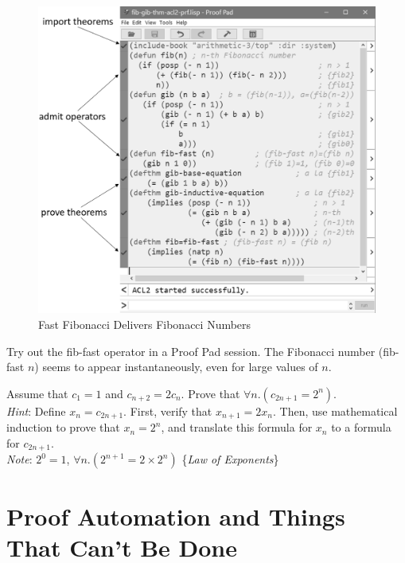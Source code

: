 \begin{figure}
\begin{center}
\includegraphics[scale=0.5]{images/fib-gib-thm-acl2-prf.png}
\end{center}
\caption{Fast Fibonacci Delivers Fibonacci Numbers}
\label{fig:fib-gib-thm}
\end{figure}

Try out the fib-fast operator in a Proof Pad session.
The Fibonacci number (fib-fast $n$) seems to appear
instantaneously, even for large values of $n$.

\begin{ExerciseList}

\Exercise Assume that $c_1 = 1$ and $c_{n+2} = 2c_n$.
Prove that $\forall n.(c_{2n+1} = 2^n)$.\\
\emph{Hint}: Define $x_n = c_{2n+1}$.
First, verify that $x_{n+1} = 2x_n$.
Then, use mathematical induction to prove that $x_n = 2^n$,
and translate this formula for $x_n$
to a formula for $c_{2n+1}$.\\
\emph{Note}: $2^0 = 1$, $\forall n.(2^{n+1} = 2 \times 2^n)$ \{\emph{Law of Exponents}\}

\end{ExerciseList}

\section{Proof Automation and Things That Can't Be Done}
\label{sec:halting-problem}

